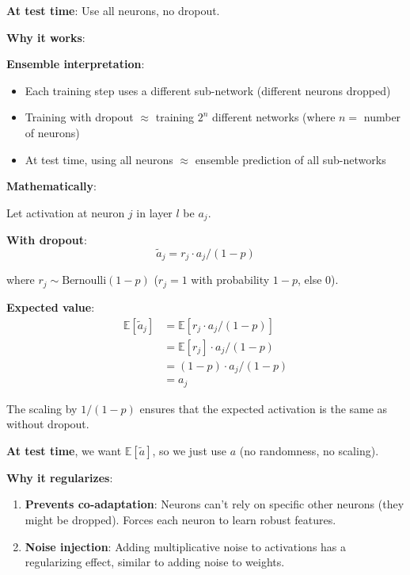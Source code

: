 \textbf{At test time}: Use all neurons, no dropout.

\textbf{Why it works}:

\textbf{Ensemble interpretation}:
\begin{itemize}
    \item Each training step uses a different sub-network (different neurons dropped)
    \item Training with dropout $\approx$ training $2^n$ different networks (where $n =$ number of neurons)
    \item At test time, using all neurons $\approx$ ensemble prediction of all sub-networks
\end{itemize}

\textbf{Mathematically}:

Let activation at neuron $j$ in layer $l$ be $a_j$.

\textbf{With dropout}:
\begin{equation}
\tilde{a}_j = r_j \cdot a_j / (1-p)
\end{equation}

where $r_j \sim \text{Bernoulli}(1-p)$ ($r_j = 1$ with probability $1-p$, else 0).

\textbf{Expected value}:
\begin{align}
\mathbb{E}[\tilde{a}_j] &= \mathbb{E}[r_j \cdot a_j / (1-p)] \\
&= \mathbb{E}[r_j] \cdot a_j / (1-p) \\
&= (1-p) \cdot a_j / (1-p) \\
&= a_j
\end{align}

The scaling by $1/(1-p)$ ensures that the expected activation is the same as without dropout.

\textbf{At test time}, we want $\mathbb{E}[\tilde{a}]$, so we just use $a$ (no randomness, no scaling).

\textbf{Why it regularizes}:

\begin{enumerate}
    \item \textbf{Prevents co-adaptation}: Neurons can't rely on specific other neurons (they might be dropped). Forces each neuron to learn robust features.

    \item \textbf{Noise injection}: Adding multiplicative noise to activations has a regularizing effect, similar to adding noise to weights.
\end{enumerate}

